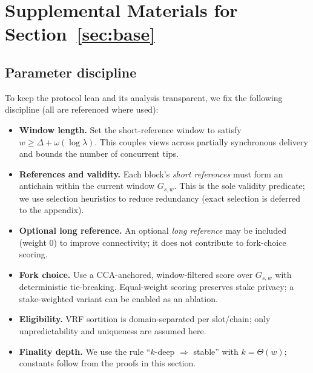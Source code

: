 


\section{Supplemental Materials for Section~\ref{sec:base}}
\label{app:base}

\subsection{Parameter discipline}
\label{sec:param-discipline}


To keep the protocol lean and its analysis transparent, we fix the following discipline (all are referenced where used):
\begin{itemize}
  \item \textbf{Window length.} Set the short-reference window to satisfy $w \ge \Delta + \omega(\log \lambda)$. This couples views across partially synchronous delivery and bounds the number of concurrent tips.
  \item \textbf{References and validity.} Each block’s \emph{short references} must form an antichain within the current window $G_{s,w}$. This is the sole validity predicate; we use selection heuristics to reduce redundancy (exact selection is deferred to the appendix).
  \item \textbf{Optional long reference.} An optional \emph{long reference} may be included (weight $0$) to improve connectivity; it does not contribute to fork-choice scoring.
  \item \textbf{Fork choice.} Use a CCA-anchored, window-filtered score over $G_{s,w}$ with deterministic tie-breaking. Equal-weight scoring preserves stake privacy; a stake-weighted variant can be enabled as an ablation.
  \item \textbf{Eligibility.} VRF sortition is domain-separated per slot/chain; only unpredictability and uniqueness are assumed here.
  \item \textbf{Finality depth.} We use the rule “$k$-deep $\Rightarrow$ stable” with $k=\Theta(w)$; constants follow from the proofs in this section.
\end{itemize}




